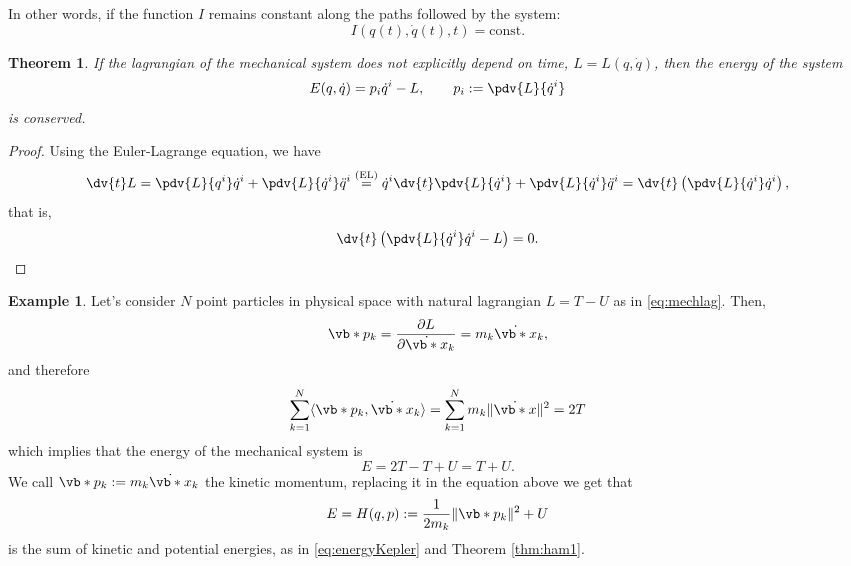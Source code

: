 \documentclass[english,fontsize=11pt,paper=b5]{scrbook}
\newtheorem{theorem}{Theorem}[chapter]
\theoremstyle{definition}
\newtheorem{example}{Example}[chapter]
\begin{document}
    In other words, if the function $I$ remains constant along the paths followed by the system:
    \begin{equation}
      I(q(t),\dot q(t), t) = \mathrm{const}.
    \end{equation}

    \begin{theorem}\label{thm:conservationEnergy}
      If the lagrangian of the mechanical system does not explicitly depend on time, $L = L(q, \dot q)$, then the \emph{energy} of the system
      \begin{equation}\label{eq:energy1}
        E(q,\dot q) = p_i \dot q^i - L,\qquad p_i := \pdv{L}{\dot q^i}
      \end{equation}
      is conserved.
    \end{theorem}
    \begin{proof}
      Using the Euler-Lagrange equation, we have
      \begin{equation}
        \dv{t} L
        = \pdv{L}{q^i} \dot q^i + \pdv{L}{\dot q^i} \ddot q^i
        \overset{\text{(EL)}}{=} \dot q^i \dv{t} \pdv{L}{\dot q^i} + \pdv{L}{\dot q^i} \ddot q^i
        = \dv{t}\left(\pdv{L}{\dot q^i} \dot q^i\right),
      \end{equation}
      that is,
      \begin{equation}
        \dv{t}\left(\pdv{L}{\dot q^i} \dot q^i - L\right) = 0.
      \end{equation}
    \end{proof}

    \begin{example}\label{ex:natlagham}
      Let's consider $N$ point particles in physical space with natural lagrangian $L = T - U$ as in \eqref{eq:mechlag}.
      Then,
      \begin{equation}
        \vb*{p}_k = \frac{\partial L}{\partial \dot{\vb*{x}}_k} = m_k \dot{\vb*{x}}_k,
      \end{equation}
      and therefore
      \begin{equation}
        \sum_{k=1}^{N} \langle\vb*{p}_k, \dot{\vb*{x}}_k\rangle = \sum_{k=1}^{N} m_k \|\dot{\vb*{x}}\|^2 = 2 T
      \end{equation}
      which implies that the energy of the mechanical system is
      \begin{equation}\label{eq:energyFromL}
        E = 2T - T + U = T + U.
      \end{equation}
      We call $\vb*{p}_k := m_k \dot{\vb*{x}}_k$ the kinetic momentum, replacing it in the equation above we get that
      \begin{equation}
        E = H(q,p) := \frac{1}{2 m_k}\|\vb*{p}_k\|^2 + U
      \end{equation}
      is the sum of kinetic and potential energies, as in \eqref{eq:energyKepler} and Theorem \ref{thm:ham1}.
    \end{example}
\end{document}
